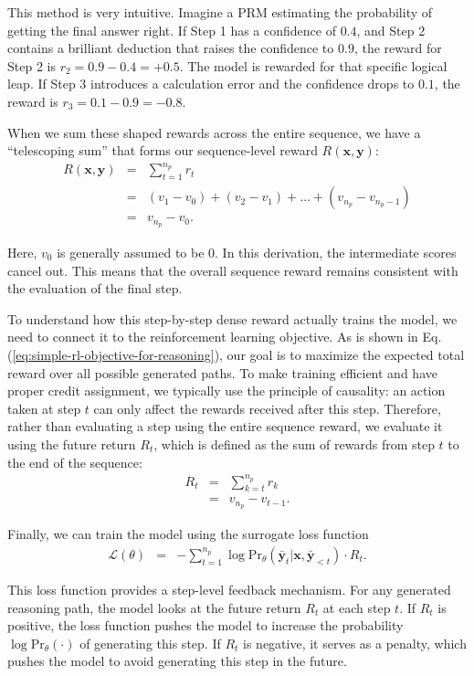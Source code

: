 This method is very intuitive. Imagine a PRM estimating the probability of getting the final answer right. If Step 1 has a confidence of $0.4$, and Step 2 contains a brilliant deduction that raises the confidence to $0.9$, the reward for Step 2 is $r_2 = 0.9 - 0.4 = +0.5$. The model is rewarded for that specific logical leap. If Step 3 introduces a calculation error and the confidence drops to $0.1$, the reward is $r_3 = 0.1 - 0.9 = -0.8$.

When we sum these shaped rewards across the entire sequence, we have a ``telescoping sum'' that forms our sequence-level reward $R(\mathbf{x}, \mathbf{y})$:
\begin{eqnarray}
R(\mathbf{x}, \mathbf{y}) & = & \sum_{t=1}^{n_p} r_t \nonumber \\
& = & (v_1 - v_0) + (v_2 - v_1) + \dots + (v_{n_p} - v_{n_p-1}) \nonumber \\
& = & v_{n_p} - v_0.
\end{eqnarray}

\noindent Here, $v_0$ is generally assumed to be 0. In this derivation, the intermediate scores cancel out. This means that the overall sequence reward remains consistent with the evaluation of the final step.

To understand how this step-by-step dense reward actually trains the model, we need to connect it to the reinforcement learning objective. As is shown in Eq. (\ref{eq:simple-rl-objective-for-reasoning}), our goal is to maximize the expected total reward over all possible generated paths. To make training efficient and have proper credit assignment, we typically use the principle of causality: an action taken at step $t$ can only affect the rewards received after this step. Therefore, rather than evaluating a step using the entire sequence reward, we evaluate it using the future return $R_t$, which is defined as the sum of rewards from step $t$ to the end of the sequence:
\begin{eqnarray}
R_t & = & \sum_{k=t}^{n_p} r_k \nonumber \\
& = & v_{n_p} - v_{t-1}.
\end{eqnarray}

Finally, we can train the model using the surrogate loss function
\begin{eqnarray}
\mathcal{L}(\theta) & = & - \sum_{t=1}^{n_p} \log \mathrm{Pr}_{\theta}(\bar{\mathbf{y}}_t | \mathbf{x}, \bar{\mathbf{y}}_{<t}) \cdot R_t.
\end{eqnarray}

This loss function provides a step-level feedback mechanism. For any generated reasoning path, the model looks at the future return $R_t$ at each step $t$. If $R_t$ is positive, the loss function pushes the model to increase the probability $\log \mathrm{Pr}_\theta(\cdot)$ of generating this step. If $R_t$ is negative, it serves as a penalty, which pushes the model to avoid generating this step in the future.


